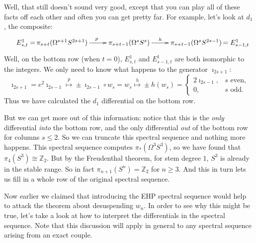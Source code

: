 \documentclass{article}
\newcommand{\ConfusedBox}[1]{
\begin{center}\scalebox{.5}{\fbox{\begin{minipage}{\textwidth}
#1
\end{minipage}}}
\end{center}
}
\newcommand{\Z}{\mathbb{Z}}
\newcommand{\Loops}{\Omega}
\begin{document}
Well, that still doesn't sound very good, except that you can play all of these facts off each other and often you can get pretty far.  For example, let's look at $d_1$, the composite:
\[\xymatrix{
\makebox[0cm][r]{$E^1_{s,t}=$\,}
\pi_{s+t}(\Omega^{s+1}S^{2s+1})\ar[r]^{\ p}&\pi_{s+t-1}(\Omega^s S^s)\ar[r]^{h\ \ }&\pi_{s+t-1}(\Omega^{s}S^{2s-1})\makebox[0cm][l]{\,$=E^1_{s-1,t}$}
}\]
Well, on the bottom row (when $t=0$), $E^1_{s,t}$ and $E^1_{s-1,t}$ are both isomorphic to the integers. We only need to know what happens to the generator $\imath_{2s+1}$:
\[\imath_{2s+1}=e^2\imath_{2s-1}\overset{p}{\longmapsto}\pm \imath_{2s-1}\circ w_{s}=w_s\overset{h}{\longmapsto} \pm h(w_s)=\begin{cases}2\imath_{2s-1},&\text{$s$ even,}\\0,&\text{$s$ odd.}\end{cases}\]
Thus we have calculated the $d_1$ differential on the bottom row.

But we can get more out of this information: notice that this is the \emph{only} differential \emph{into} the bottom row, and the only differential \emph{out} of the bottom row for columns $s \le 2$.  So we can truncate this spectral sequence and nothing more happens. This spectral sequence computes $\pi_* (\Loops^3 S^3)$, so we have found that $\pi_4 (S^3) \cong \Z_2$.  But by the Freudenthal theorem, for stem degree $1$, $S^3$ is already in the stable range.  So in fact $\pi_{n+1} (S^n) = \Z_2$ for $n \ge 3$.  And this in turn lets us fill in a whole row of the original spectral sequence.


Now earlier we claimed that introducing the EHP spectral sequence would help to attack the theorem about desuspending $w_n$.  In order to see why this might be true, let's take a look at how to interpret the differentials in the spectral sequence. Note that this discussion will apply in general to any spectral sequence arising from an exact couple.
\end{document}
